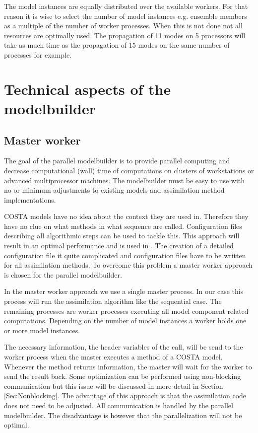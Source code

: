 \documentclass[a4paper,12pt]{article}
\begin{document}
The model instances are equally distributed over the available workers. For
that reason it is wise to select the number of model instances e.g.
ensemble members as a multiple of the number of worker processes. When this
is not done not all resources are optimally used. The propagation of 11
modes on 5 processors will take as much time as the propagation of 15
modes on the same number of processes for example.


\section{Technical aspects of the modelbuilder}
 \label{Sec:Technical aspects of the modelbuilder}
\subsection{Master worker}
The goal of the parallel modelbuilder is to provide parallel computing and
decrease computational (wall) time of computations on clusters of
workstations or advanced multiprocessor machines. The modelbuilder must be
easy to use with no or minimum adjustments to existing models and
assimilation method implementations.

COSTA models have no idea about the context they are used in. Therefore
they have no clue on what methods in what sequence are called.
Configuration files describing all algorithmic steps can be used to tackle
this. This approach will result in an optimal performance and is used in
\cite{Roest02a}. The creation of a detailed configuration file
it quite complicated and configuration files have to be written
for all assimilation methods. To overcome this problem a master worker
approach is chosen for the parallel modelbuilder.

In the master worker approach we use a single master process. In our case
this process will run the assimilation algorithm like the sequential case.
The remaining processes are worker processes executing all model component
related computations. Depending on the number of model instances a worker
holds one or more model instances.

The necessary information, the header variables of the call, will be send
to the worker process when the master executes a method of a COSTA model.
Whenever the method returns information, the master will wait for the
worker to send the result back. Some optimization can be performed using
non-blocking communication but this issue will be discussed in more detail
in Section \ref{Sec:Nonblocking}. The advantage of this approach is that
the assimilation code does not need to be adjusted. All communication is
handled by the parallel modelbuilder. The disadvantage is however that the
parallelization will not be optimal. 
\end{document}
